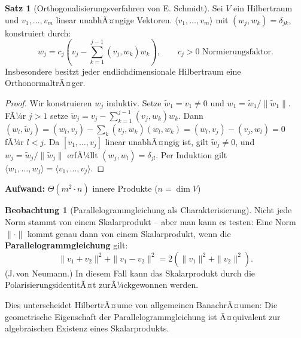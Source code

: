 ﻿\documentclass[a4paper,12pt]{report}
\theoremstyle{definition}
\newtheorem{satz}{Satz}
\newtheorem{beobachtung}{Beobachtung}
\begin{document}
\begin{satz}[Orthogonalisierungsverfahren von E. Schmidt]
    Sei $V$ ein Hilbertraum und $v_1, \dots, v_m$
    linear unabhÃ¤ngige Vektoren.
    $\langle v_1, \dots, v_m \rangle$ mit $(w_j, w_k) = \delta_{jk}$,
    konstruiert durch:
    \[
        w_j = c_j \!\left(v_j - \sum_{k=1}^{j-1} (v_j, w_k) w_k\right),
        \qquad c_j > 0 \text{ Normierungsfaktor.}
    \]
    Insbesondere besitzt jeder endlichdimensionale Hilbertraum eine
    OrthonormaltrÃ¤ger.
\end{satz}
\begin{proof}
    Wir konstruieren $w_j$ induktiv. Setze $\tilde{w}_1 = v_1 \neq 0$ und
    $w_1 = \tilde{w}_1 / \|\tilde{w}_1\|$.
    FÃ¼r $j > 1$ setze $\tilde{w}_j = v_j - \sum_{k=1}^{j-1} (v_j, w_k) w_k$.
    Dann $(w_l, \tilde{w}_j) = (w_l, v_j) - \sum_k (v_j, w_k)(w_l, w_k)
    = (w_l, v_j) - (v_j, w_l) = 0$ fÃ¼r $l < j$.
    Da $[v_1, \ldots, v_j]$ linear unabhÃ¤ngig ist, gilt $\tilde{w}_j \neq 0$,
    und $w_j = \tilde{w}_j / \|\tilde{w}_j\|$ erfÃ¼llt $(w_j, w_l) = \delta_{jl}$.
    Per Induktion gilt $\langle w_1, \ldots, w_j \rangle = \langle v_1, \ldots, v_j \rangle$.
\end{proof}


\begin{algorithm}[H]
\DontPrintSemicolon
\caption{Gram-Schmidt-Orthogonalisierung}\label{alg:schmidt}
\;
\BlankLine
\textbf{Aufwand:} $\Theta(m^2 \cdot n)$ innere Produkte ($n = \dim V$)
\end{algorithm}


\begin{beobachtung}[Parallelogrammgleichung als Charakterisierung]
    Nicht jede Norm stammt von einem Skalarprodukt -- aber man kann es
    testen: Eine Norm $\|\cdot\|$ kommt genau dann von einem Skalarprodukt,
    wenn die \textbf{Parallelogrammgleichung} gilt:
    \[
        \|v_1 + v_2\|^2 + \|v_1 - v_2\|^2 = 2(\|v_1\|^2 + \|v_2\|^2).
    \]
    (J.\,von Neumann.) In diesem Fall kann das Skalarprodukt durch die
    PolarisierungsidentitÃ¤t zurÃ¼ckgewonnen werden.

    Dies unterscheidet HilbertrÃ¤ume von allgemeinen BanachrÃ¤umen:
    Die geometrische Eigenschaft der Parallelogrammgleichung ist Ã¤quivalent
    zur algebraischen Existenz eines Skalarprodukts.
\end{beobachtung}
\end{document}
